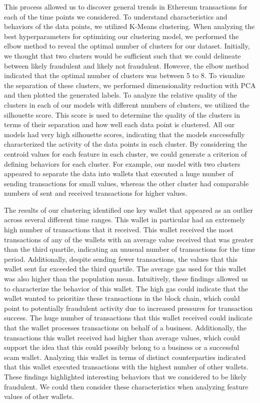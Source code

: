 \documentclass[sigconf]{acmart}
\begin{document}
This process allowed us to discover general trends in Ethereum transactions for each of the time points we considered. To understand characteristics and behaviors of the data points, we utilized K-Means clustering. When analyzing the best hyperparameters for optimizing our clustering model, we performed the elbow method to reveal the optimal number of clusters for our dataset. Initially, we thought that two clusters would be sufficient such that we could delineate between likely fraudulent and likely not fraudulent. However, the elbow method indicated that the optimal number of clusters was between 5 to 8. To visualize the separation of these clusters, we performed dimensionality reduction with PCA and then plotted the generated labels. To analyze the relative quality of the clusters in each of our models with different numbers of clusters, we utilized the silhouette score. This score is used to determine the quality of the clusters in terms of their separation and how well each data point is clustered. All our models had very high silhouette scores, indicating that the models successfully characterized the activity of the data points in each cluster. By considering the centroid values for each feature in each cluster, we could generate a criterion of defining behaviors for each cluster. For example, our model with two clusters appeared to separate the data into wallets that executed a huge number of sending transactions for small values, whereas the other cluster had comparable numbers of sent and received transactions for higher values. 

The results of our clustering identified one key wallet that appeared as an outlier across several different time ranges. This wallet in particular had an extremely high number of transactions that it received. This wallet received the most transactions of any of the wallets with an average value received that was greater than the third quartile, indicating an unusual number of transactions for the time period. Additionally, despite sending fewer transactions, the values that this wallet sent far exceeded the third quartile.  The average gas used for this wallet was also higher than the population mean. Intuitively, these findings allowed us to characterize the behavior of this wallet. The high gas could indicate that the wallet wanted to prioritize these transactions in the block chain, which could point to potentially fraudulent activity due to increased pressures for transaction success. The huge number of transactions that this wallet received could indicate that the wallet processes transactions on behalf of a business. Additionally, the transactions this wallet received had higher than average values, which could support the idea that this could possibly belong to a business or a successful scam wallet. Analyzing this wallet in terms of distinct counterparties indicated that this wallet executed transactions with the highest number of other wallets. These findings highlighted interesting behaviors that we considered to be likely fraudulent. We could then consider these characteristics when analyzing feature values of other wallets. 
\end{document}

